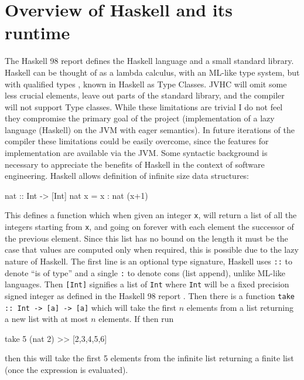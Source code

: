 \documentclass[float=false, crop=false]{standalone}
\begin{document}
\section{Overview of Haskell and its runtime}

The Haskell 98 \cite{haskell98-spec} report defines the Haskell language 
and a small standard library.
Haskell can be thought of as a lambda calculus, with an ML-like type system,
but with qualified types \cite{qualified-types}, known in 
Haskell as Type Classes. JVHC will omit some less crucial elements,
leave out parts of the standard library, 
and the compiler will  not support Type classes. While these limitations are trivial I do not feel they compromise the primary goal of the project  
(implementation of a lazy language (Haskell)
on the JVM with eager semantics). In future iterations of the compiler these limitations could be easily overcome, since the features for implementation are available via the JVM.
Some syntactic background is necessary to appreciate 
the benefits of Haskell in the context of software engineering.
Haskell allows definition of infinite size data structures:
\begin{HaskellLst}
nat :: Int -> [Int]
nat x = x : nat (x+1)
\end{HaskellLst}
This defines a function which when given an integer \verb|x|, will return 
a list of all the integers starting from \texttt{x}, and going on forever with
each element the successor of the previous element.
Since this list has no bound on the length it must be the case 
that values are computed only when required, 
this is possible due to the lazy nature of Haskell. 
The first line is an optional type signature, Haskell
uses \verb|::| to denote ``is of type'' and a single \verb|:| to denote cons (list append), unlike ML-like languages. Then \verb|[Int]| signifies a list
of \verb|Int| where \verb|Int| will be a fixed precision 
signed integer as defined in the Haskell 98 report 
\cite[]{haskell98-spec}.
Then there is a function \verb|take :: Int -> [a] -> [a]| which will
take the first $n$ elements from a list returning a new list with at most
$n$ elements.
If then run 
\begin{HaskellLst}
take 5 (nat 2)
>> [2,3,4,5,6]
\end{HaskellLst}
then this will take the first 5 elements from the infinite list returning 
a finite list (once the expression is evaluated).
\end{document}

